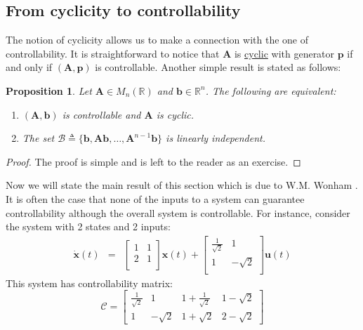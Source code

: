 \documentclass[a4paper,10pt,oneside]{book}
\newtheorem{proposition}[theorem]{Proposition}
\begin{document}
\subsection{From cyclicity to controllability}\label{sec:FromCyclicityToControllability}
The notion of cyclicity allows us to make a connection with the one of controllability. It is straightforward to notice that $\mathbf{A}$ is \hyperlink{def:cyclicMatrix}{cyclic} with generator $\mathbf{p}$ if and only if $(\mathbf{A},\mathbf{p})$ is controllable. Another simple result is stated as follows:
\begin{proposition}
 Let $\mathbf{A}\in M_{n}(\mathbb{R})$ and $\mathbf{b}\in\mathbb{R}^n$. The following are equivalent:
 \begin{enumerate}
  \item $(\mathbf{A},\mathbf{b})$ is controllable and $\mathbf{A}$ is cyclic.
  \item The set $\mathcal{B}\triangleq\{\mathbf{b},\mathbf{Ab},\ldots,\mathbf{A}^{n-1}\mathbf{b}\}$ is linearly independent.
 \end{enumerate}
\end{proposition}
\begin{proof}
 The proof is simple and is left to the reader as an exercise.
\end{proof}
Now we will state the main result of this section which is due to W.M. Wonham \cite{Won67}. It is often the case that none of the inputs to a system can guarantee controllability although the overall system is controllable. For instance, consider the system with 2 states and 2 inputs:
 \begin{eqnarray}
\dot{\mathbf{x}}(t)&=&\left[ {\begin{array}{cc}
 1 & 1  \\
 2 & 1  \\
 \end{array} } \right]
\mathbf{x}(t)+ 
\left[ {\begin{array}{cc}
 \frac{1}{\sqrt{2}}  & 1\\
 1 & -\sqrt{2}\\
 \end{array} } \right]
\mathbf{u}(t)
\end{eqnarray}
This system has controllability matrix:
\begin{equation}
 \mathcal{C}=\left[ {\begin{array}{cccc}
 \frac{1}{\sqrt{2}} & 1 & 1+\frac{1}{\sqrt{2}} & 1-\sqrt{2}\\
 1 & -\sqrt{2} & 1+\sqrt{2} & 2-\sqrt{2}
 \end{array} } \right]
\end{equation}
\end{document}
